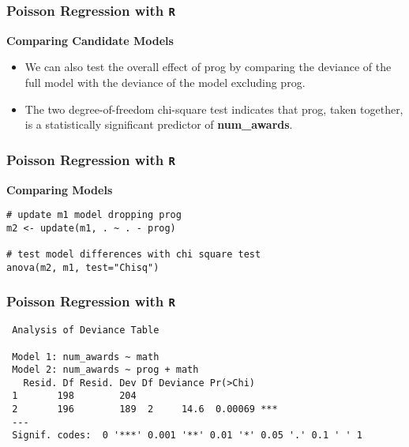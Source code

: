 \documentclass[MASTER.tex]{subfiles}
\begin{document}
%
%
% 

\begin{frame}[fragile]

\frametitle{Poisson Regression with \texttt{R}}
\Large 
\textbf{Comparing Candidate Models}
\begin{itemize}
\item 
We can also test the overall effect of prog by comparing the deviance of the full model with the deviance of the model 
excluding prog.
\item The two degree-of-freedom chi-square test indicates that prog, taken together, is a statistically significant predictor of \textbf{num\_awards}.
\end{itemize} 

\end{frame}

\begin{frame}[fragile]

\frametitle{Poisson Regression with \texttt{R}}
\large
\textbf{Comparing Models}
\begin{framed}
\begin{verbatim}
# update m1 model dropping prog
m2 <- update(m1, . ~ . - prog)

# test model differences with chi square test
anova(m2, m1, test="Chisq")
\end{verbatim}
\end{framed}
\end{frame}


\begin{frame}[fragile]
\frametitle{Poisson Regression with \texttt{R}}
\begin{verbatim}
 Analysis of Deviance Table
 
 Model 1: num_awards ~ math
 Model 2: num_awards ~ prog + math
   Resid. Df Resid. Dev Df Deviance Pr(>Chi)    
 1       198        204                         
 2       196        189  2     14.6  0.00069 ***
 ---
 Signif. codes:  0 '***' 0.001 '**' 0.01 '*' 0.05 '.' 0.1 ' ' 1
\end{verbatim}

\end{frame}
\end{document}
